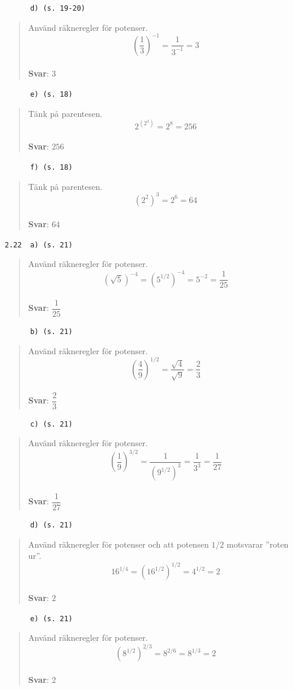 \documentclass[a4paper]{article}
\newcommand{\tskcol}[1]{\textcolor{tskcol}{#1}}
\begin{document}
	\pagebreak
	\texttt{\tskcol{~~~~~~d) (s. 19-20)}}
	\begin{quotation}
		\noindent
		Använd räkneregler för potenser.
		\[\left(\frac{1}{3}\right)^{-1}=\frac{1}{3^{-1}}=3\]
		\\
		\textbf{Svar}: $3$
	\end{quotation}
	
	\texttt{\tskcol{~~~~~~e) (s. 18)}}
	\begin{quotation}
		\noindent
		Tänk på parentesen.
		\[2^{(2^3)}=2^8=256\]
		\\
		\textbf{Svar}: $256$
	\end{quotation}
	
	\texttt{\tskcol{~~~~~~f) (s. 18)}}
	\begin{quotation}
		\noindent
		Tänk på parentesen.
		\[(2^2)^3=2^6=64\]
		\\
		\textbf{Svar}: $64$
	\end{quotation}
	
	\texttt{\tskcol{2.22~~a) (s. 21)}}
	\begin{quotation}
		\noindent
		Använd räkneregler för potenser.
		\[(\sqrt{5})^{-4}=(5^{1/2})^{-4}=5^{-2}=\frac{1}{25}\]
		\\
		\textbf{Svar}: $\dfrac{1}{25}$
	\end{quotation}
	
	\texttt{\tskcol{~~~~~~b) (s. 21)}}
	\begin{quotation}
		\noindent
		Använd räkneregler för potenser.
		\[\left(\frac{4}{9}\right)^{1/2}=\frac{\sqrt{4}}{\sqrt{9}}=\frac{2}{3}\]
		\\
		\textbf{Svar}: $\dfrac{2}{3}$
	\end{quotation}
	
	\texttt{\tskcol{~~~~~~c) (s. 21)}}
	\begin{quotation}
		\noindent
		Använd räkneregler för potenser.
		\[\left(\frac{1}{9}\right)^{3/2}=\frac{1}{(9^{1/2})^3}=\frac{1}{3^3}=\frac{1}{27}\]
		\\
		\textbf{Svar}: $\dfrac{1}{27}$
	\end{quotation}
	
	\pagebreak
	\texttt{\tskcol{~~~~~~d) (s. 21)}}
	\begin{quotation}
		\noindent
		Använd räkneregler för potenser och att potensen $1/2$ motsvarar ''roten ur''.
		\[16^{1/4}=(16^{1/2})^{1/2}=4^{1/2}=2\]
		\\
		\textbf{Svar}: $2$
	\end{quotation}
	
	\texttt{\tskcol{~~~~~~e) (s. 21)}}
	\begin{quotation}
		\noindent
		Använd räkneregler för potenser.
		\[(8^{1/2})^{2/3}=8^{2/6}=8^{1/3}=2\]
		\\
		\textbf{Svar}: $2$
	\end{quotation}
	
\end{document}
